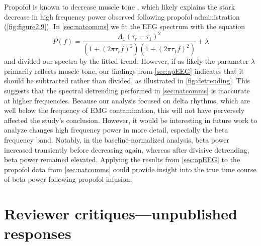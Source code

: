 Propofol is known to decrease muscle tone \cite{Brown2011}, which likely explains the stark decrease in high frequency power observed following propofol administration (\autoref{fig:figure2.9}). In \autoref{sec:natcomms} we fit the EEG spectrum with the equation
\begin{equation*}
P(f) = \frac{A_1\left(\tau_r-\tau_1\right)^2}{\left(1+\left(2\pi\tau_rf\right)^2\right)\left(1+\left(2\pi\tau_1f\right)^2\right)}+\lambda
\end{equation*}
and divided our spectra by the fitted trend. However, if as likely the parameter $\lambda$ primarily reflects muscle tone, our findings from \autoref{sec:apEEG} indicates that it should be subtracted rather than divided, as illustrated in \autoref{fig:detrending}. This suggests that the spectral detrending performed in \autoref{sec:natcomms} is inaccurate at higher frequencies. Because our analysis focused on delta rhythms, which are well below the frequency of EMG contamination, this will not have perversely affected the study's conclusion. However, it would be interesting in future work to analyze changes high frequency power in more detail, especially the beta frequency band. Notably, in the baseline-normalized analysis, beta power increased transiently before decreasing again, whereas after divisive detrending, beta power remained elevated. Applying the results from \autoref{sec:apEEG} to the propofol data from \autoref{sec:natcomms} could provide insight into the true time course of beta power following propofol infusion. 

\section{Reviewer critiques---unpublished responses}

